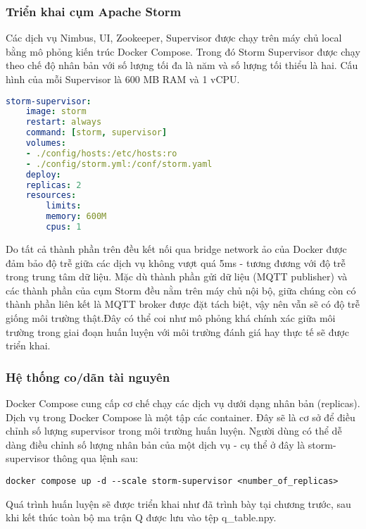 \subsubsection{Triển khai cụm Apache Storm}

Các dịch vụ Nimbus, UI, Zookeeper, Supervisor được chạy trên máy chủ local bằng mô phỏng kiến trúc Docker Compose. Trong đó Storm Supervisor được chạy theo chế độ nhân bản với số lượng tối đa là năm và số lượng tối thiểu là hai. Cấu hình của mỗi Supervisor là 600 MB RAM và 1 vCPU.

\begin{lstlisting}[language=yaml, caption={Cấu hình của các supervisor}]
storm-supervisor:
    image: storm
    restart: always
    command: [storm, supervisor]
    volumes:
    - ./config/hosts:/etc/hosts:ro
    - ./config/storm.yml:/conf/storm.yaml
    deploy:
    replicas: 2
    resources:
        limits:
        memory: 600M
        cpus: 1
\end{lstlisting}

Do tất cả thành phần trên đều kết nối qua bridge network ảo của Docker được đảm bảo độ trễ giữa các dịch vụ không vượt quá 5ms - tương đương với độ trễ trong trung tâm dữ liệu. Mặc dù thành phần gửi dữ liệu (MQTT publisher) và các thành phần của cụm Storm đều nằm trên máy chủ nội bộ, giữa chúng còn có thành phần liên kết là MQTT broker được đặt tách biệt, vậy nên vẫn sẽ có độ trễ giống môi trường thật.Đây có thể coi như mô phỏng khá chính xác giữa môi trường trong giai đoạn huấn luyện với môi trường đánh giá hay thực tế sẽ được triển khai.

\subsubsection{Hệ thống co/dãn tài nguyên}

Docker Compose cung cấp cơ chế chạy các dịch vụ dưới dạng nhân bản (replicas). Dịch vụ trong Docker Compose là một tập các container. Đây sẽ là cơ sở để điều chỉnh số lượng supervisor trong môi trường huấn luyện. Người dùng có thể dễ dàng điều chỉnh số lượng nhân bản của một dịch vụ - cụ thể ở đây là storm-supervisor thông qua lệnh sau:

\begin{verbatim}
docker compose up -d --scale storm-supervisor <number_of_replicas>
\end{verbatim}

Quá trình huấn luyện sẽ được triển khai như đã trình bày tại chương trước, sau khi kết thúc toàn bộ ma trận Q được lưu vào tệp q\_table.npy.

